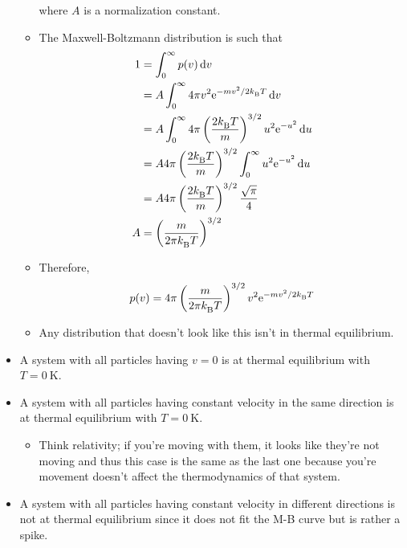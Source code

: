 \documentclass[../notes.tex]{subfiles}
\begin{document}
\begin{itemize}
\begin{itemize}
        where $A$ is a normalization constant.
        \item The Maxwell-Boltzmann distribution is such that
        \begingroup
        \allowdisplaybreaks
        \begin{align*}
            1 &= \int_0^\infty p(v)\dd{v}\\
            &= A\int_0^\infty 4\pi v^2\e[-mv^2/2\kB T]\dd{v}\\
            &= A\int_0^\infty 4\pi\left( \frac{2\kB T}{m} \right)^{3/2}u^2\e[-u^2]\dd{u}\\
            &= A4\pi\left( \frac{2\kB T}{m} \right)^{3/2}\int_0^\infty u^2\e[-u^2]\dd{u}\\
            &= A4\pi\left( \frac{2\kB T}{m} \right)^{3/2}\frac{\sqrt{\pi}}{4}\\
            A &= \left( \frac{m}{2\pi \kB T} \right)^{3/2}
        \end{align*}
        \endgroup
        \item Therefore,
        \begin{equation*}
            p(v) = 4\pi\left( \frac{m}{2\pi \kB T} \right)^{3/2}v^2\e[-mv^2/2\kB T]
        \end{equation*}
        \item Any distribution that doesn't look like this isn't in thermal equilibrium.
    \end{itemize}
    \item A system with all particles having $v=0$ is at thermal equilibrium with $T=\SI{0}{\kelvin}$.
    \item A system with all particles having constant velocity in the same direction is at thermal equilibrium with $T=\SI{0}{\kelvin}$.
    \begin{itemize}
        \item Think relativity; if you're moving with them, it looks like they're not moving and thus this case is the same as the last one because you're movement doesn't affect the thermodynamics of that system.
    \end{itemize}
    \item A system with all particles having constant velocity in different directions is not at thermal equilibrium since it does not fit the M-B curve but is rather a spike.
\end{itemize}
\end{document}
